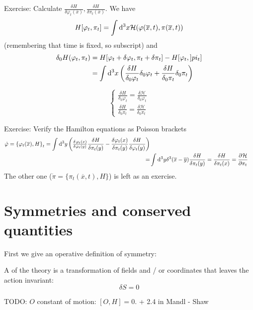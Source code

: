 \begin{example}
Exercise: Calculate $\frac{\delta H}{\delta \varphi_t(\overline{x})}, \frac{\delta H}{\delta \pi_t(\overline{x})}$.
We have
\[ H[\varphi_t, \pi_t] = \int \operatorname{d \!}{^3x}\mathcal{H}(\varphi(\overline{x},t), \pi(\overline{x},t)) \]
(remembering that time is fixed, so subscript) and
\begin{align*} \delta_0 H(\varphi_t, \pi_t) &= H[\varphi_t+ \delta\varphi_t , \pi_t + \delta \pi_t] - H[\varphi_t, ]pi_t] \\
&= \int \operatorname{d \!}{^3x}\left(\frac{\delta H}{\delta_0 \varphi_t}\delta_0 \varphi_t + \frac{\delta H}{\delta_0 \pi_t}\delta_0 \pi_t\right)
\end{align*}
\end{example}

\[ \begin{cases}
\frac{\delta H}{\delta_0 \varphi_t} = \frac{\delta \mathcal{H}}{\delta_0 \varphi_t} \\
\frac{\delta H}{\delta_0 \pi_t} = \frac{\delta \mathcal{H}}{\delta_0 \pi_t}
\end{cases} \]

\begin{example}
Exercise: Verify the Hamilton equations as Poisson brackets
\begin{align*}
\dot{\varphi} = \left\{\varphi_t(\overline{x}), H\right\}_t = \int \diff{^3y}\left(\fd{\varphi_t(x)}{\varphi_t(y)} \frac{\delta H}{\delta \pi_t(y)} - \frac{\delta \varphi_t(x)}{\delta \pi_t(y)} \frac{\delta H}{\delta \varphi_t(y)} \right) \\
=& \int \diff{^3y}\delta^3(\overline{x}- \overline{y})\frac{\delta H}{\delta \pi_t(y)} = \frac{\delta H}{\delta \pi_t(x)} = \pd{\mathcal{H}}{\pi_t}
\end{align*}
The other one ($\dot{\pi} = \{ \pi_t(\overline{x},t), H \}$) is left as an exercise.
\end{example}

\section{Symmetries and conserved quantities}
First we give an operative definition of symmetry:

\begin{definition}
A  of the theory is a transformation of fields and / or coordinates that leaves the action invariant:
\[ \delta S = 0 \]
\end{definition}

TODO: $O$ constant of motion: $[O,H]=0$. + 2.4 in Mandl - Shaw

